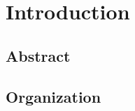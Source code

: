\chapter{Introduction}
\label{ch:introduction}

  \section{Abstract}
  \label{sec:abstract}
  

  \section{Organization}
  \label{sec:organization}
  

